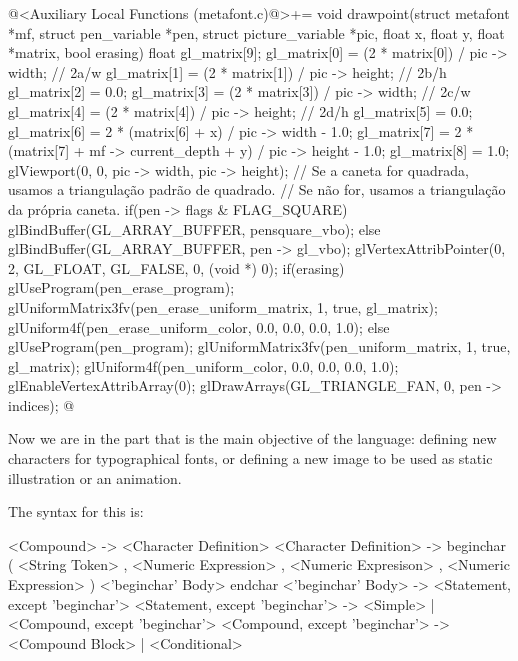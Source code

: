 {{{{{\iniciocodigo
@<Auxiliary Local Functions (metafont.c)@>+=
void drawpoint(struct metafont *mf, struct pen_variable *pen,
               struct picture_variable *pic, float x, float y, float *matrix,
               bool erasing){
  float gl_matrix[9];
  gl_matrix[0] = (2 * matrix[0]) /  pic -> width;  // 2a/w
  gl_matrix[1] = (2 * matrix[1]) /  pic -> height; // 2b/h
  gl_matrix[2] = 0.0;
  gl_matrix[3] = (2 * matrix[3]) /  pic -> width;  // 2c/w
  gl_matrix[4] = (2 * matrix[4]) /  pic -> height; // 2d/h
  gl_matrix[5] = 0.0;
  gl_matrix[6] = 2 * (matrix[6] + x) /  pic -> width - 1.0;
  gl_matrix[7] = 2 * (matrix[7] + mf -> current_depth + y) / pic -> height -
                 1.0;
  gl_matrix[8] = 1.0;
  glViewport(0, 0, pic -> width, pic -> height);
  // Se a caneta for quadrada, usamos a triangulação padrão de quadrado.
  // Se não for, usamos a triangulação da própria caneta.
  if(pen -> flags & FLAG_SQUARE)
    glBindBuffer(GL_ARRAY_BUFFER, pensquare_vbo);
  else 
    glBindBuffer(GL_ARRAY_BUFFER, pen -> gl_vbo);
  glVertexAttribPointer(0, 2, GL_FLOAT, GL_FALSE, 0, (void *) 0);
  if(erasing){
    glUseProgram(pen_erase_program);
    glUniformMatrix3fv(pen_erase_uniform_matrix, 1, true, gl_matrix);
    glUniform4f(pen_erase_uniform_color, 0.0, 0.0, 0.0, 1.0);
  }
  else{
    glUseProgram(pen_program);
    glUniformMatrix3fv(pen_uniform_matrix, 1, true, gl_matrix);
    glUniform4f(pen_uniform_color, 0.0, 0.0, 0.0, 1.0);
  }
  glEnableVertexAttribArray(0);
  glDrawArrays(GL_TRIANGLE_FAN, 0, pen -> indices);
}
@
\fimcodigo


Now we are in the part that is the main objective of the language:
defining new characters for typographical fonts, or defining a new
image to be used as static illustration or an animation.

The syntax for this is:

\alinhaverbatim
<Compound> -> <Character Definition>
<Character Definition> -> beginchar ( <String Token> ,
                                      <Numeric Expression> ,
                                      <Numeric Expresison> ,
                                      <Numeric Expression> )
                           <'beginchar' Body>
                           endchar
<'beginchar' Body> -> <Statement, except 'beginchar'>
<Statement, except 'beginchar'> -> <Simple> | <Compound, except 'beginchar'>
<Compound, except 'beginchar'> -> <Compound Block> | <Conditional>
\alinhanormal

}}}}}

